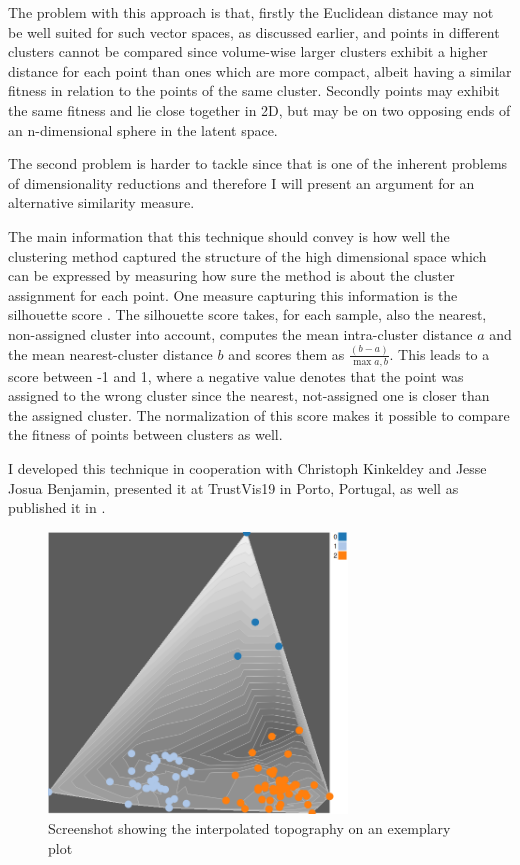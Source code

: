 The problem with this approach is that, firstly the Euclidean distance may not be well suited for such vector spaces, as discussed earlier, and points in different clusters cannot be compared since volume-wise larger clusters exhibit a higher distance for each point than ones which are more compact, albeit having a similar fitness in relation to the points of the same cluster. Secondly points may exhibit the same fitness and lie close together in 2D, but may be on two opposing ends of an n-dimensional sphere in the latent space. 

The second problem is harder to tackle since that is one of the inherent problems of dimensionality reductions and therefore I will present an argument for an alternative similarity measure.

The main information that this technique should convey is how well the clustering method captured the structure of the high dimensional space which can be expressed by measuring how sure the method is about the cluster assignment for each point. One measure capturing this information is the silhouette score \cite{rousseeuwSilhouettesGraphicalAid1987}. The silhouette score takes, for each sample, also the nearest, non-assigned cluster into account, computes the mean intra-cluster distance $a$ and the mean nearest-cluster distance $b$ and scores them as $\frac{(b-a)}{\max{a,b}}$. This leads to a score between -1 and 1, where a negative value denotes that the point was assigned to the wrong cluster since the nearest, not-assigned one is closer than the assigned cluster. The normalization of this score makes it possible to compare the fitness of points between clusters as well.  

I developed this technique in cooperation with Christoph Kinkeldey and Jesse Josua Benjamin, presented it at TrustVis19 in Porto, Portugal, as well as published it in \cite{christophkinkeldeySupportingInterpretabilityClustering2019}.

\begin{figure}[htbp!]
	\centering
	\includegraphics[width=300px]{../chapters/validation/pics/topography}
	\caption{\label{pic:topography} Screenshot showing the interpolated topography on an exemplary plot}
\end{figure}

